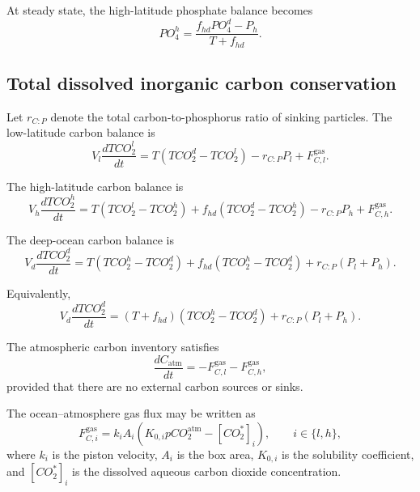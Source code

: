 \documentclass[11pt]{article}
\begin{document}
At steady state, the high-latitude phosphate balance becomes
\begin{equation}
PO_4^h
=
\frac{
f_{hd}PO_4^d-P_h
}{
T+f_{hd}
}.
\label{eq:po4_h_steady}
\end{equation}

\subsection{Total dissolved inorganic carbon conservation}

Let \(r_{C:P}\) denote the total carbon-to-phosphorus ratio
of sinking particles. The low-latitude carbon balance is
\begin{equation}
V_l\frac{dTCO_2^l}{dt}
=
T\left(TCO_2^d-TCO_2^l\right)
-
r_{C:P}P_l
+
F^{\mathrm{gas}}_{C,l}.
\label{eq:tco2_l}
\end{equation}

The high-latitude carbon balance is
\begin{equation}
V_h\frac{dTCO_2^h}{dt}
=
T\left(TCO_2^l-TCO_2^h\right)
+
f_{hd}\left(TCO_2^d-TCO_2^h\right)
-
r_{C:P}P_h
+
F^{\mathrm{gas}}_{C,h}.
\label{eq:tco2_h}
\end{equation}

The deep-ocean carbon balance is
\begin{equation}
V_d\frac{dTCO_2^d}{dt}
=
T\left(TCO_2^h-TCO_2^d\right)
+
f_{hd}\left(TCO_2^h-TCO_2^d\right)
+
r_{C:P}\left(P_l+P_h\right).
\label{eq:tco2_d}
\end{equation}

Equivalently,
\begin{equation}
V_d\frac{dTCO_2^d}{dt}
=
\left(T+f_{hd}\right)
\left(TCO_2^h-TCO_2^d\right)
+
r_{C:P}\left(P_l+P_h\right).
\end{equation}

The atmospheric carbon inventory satisfies
\begin{equation}
\frac{dC_{\mathrm{atm}}}{dt}
=
-
F^{\mathrm{gas}}_{C,l}
-
F^{\mathrm{gas}}_{C,h},
\label{eq:carbon_atmosphere}
\end{equation}
provided that there are no external carbon sources or sinks.

The ocean--atmosphere gas flux may be written as
\begin{equation}
F^{\mathrm{gas}}_{C,i}
=
k_iA_i
\left(
K_{0,i}pCO_2^{\mathrm{atm}}
-
[CO_2^\ast]_i
\right),
\qquad
i\in\{l,h\},
\label{eq:co2_gas_flux}
\end{equation}
where \(k_i\) is the piston velocity, \(A_i\) is the box area,
\(K_{0,i}\) is the solubility coefficient, and
\([CO_2^\ast]_i\) is the dissolved aqueous carbon dioxide
concentration.
\end{document}
